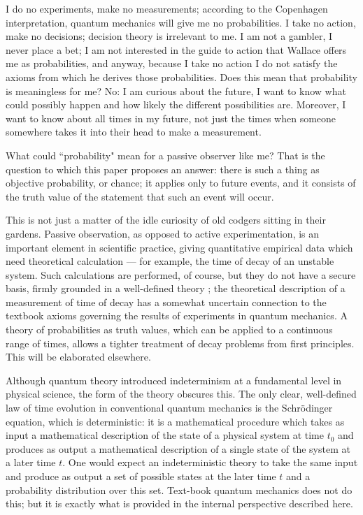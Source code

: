 \documentclass[12pt,reqno]{article}
\renewcommand{\(}{\left(}
\renewcommand{\)}{\right)}
\newcommand{\<}{\langle}
\renewcommand{\>}{\rangle}
\theoremstyle{plain} %
\begin{document}
I do no experiments, make no measurements; according to the Copenhagen interpretation, quantum mechanics will give me no probabilities. I take no action, make no decisions; decision theory is irrelevant to me. I am not a gambler, I never place a bet; I am not interested in the guide to action that Wallace offers me as probabilities, and anyway, because I take no action I do not satisfy the axioms from which he derives those probabilities. Does this mean that probability is meaningless for me? No: I am curious about the future, I want to know what could possibly happen and how likely the different possibilities are. Moreover, I want to know about all times in my future, not just the times when someone somewhere takes it into their head to make a measurement.

What could ``probability" mean for a passive observer like me? That is the question to which this paper proposes an answer: there is such a thing as objective probability, or chance; it applies only to future events, and it consists of the truth value of the statement that such an event will occur.

This is not just a matter of the idle curiosity of old codgers sitting in their gardens. Passive observation, as opposed to active experimentation, is an important element in scientific practice, giving quantitative empirical data which need theoretical calculation --- for example, the time of decay of an unstable system. Such calculations are performed, of course, but they do not have a secure basis, firmly grounded in a well-defined theory \cite{verdammte}; the theoretical description of a measurement of time of decay \cite{obsdecay} has a somewhat uncertain connection to the textbook axioms governing the results of experiments in quantum mechanics. A theory of probabilities as truth values, which can be applied to a continuous range of times, allows a tighter treatment of decay problems from first principles. This will be elaborated elsewhere.

Although quantum theory introduced indeterminism at a fundamental level in physical science, the form of the theory obscures this. The only clear, well-defined law of time evolution in conventional quantum mechanics is the Schr\"odinger equation, which is deterministic: it is a mathematical procedure which takes as input a mathematical description of the state of a physical system at time $t_0$ and produces as output a mathematical description of a single state of the system at a later time $t$. One would expect an indeterministic theory to take the same input and produce as output a set of possible states at the later time $t$ and a probability distribution over this set. Text-book quantum mechanics does not do this; but it is exactly what is provided in the internal perspective described here.
 
\end{document}
